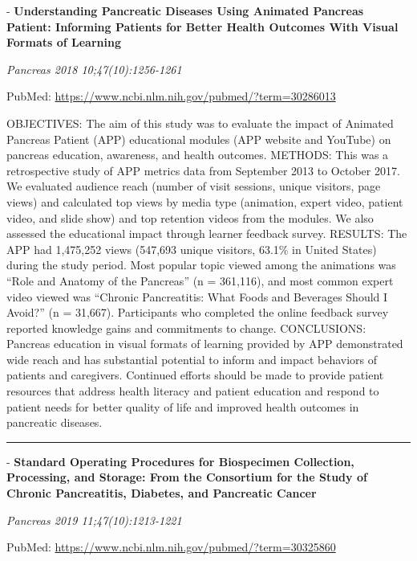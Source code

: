 \documentclass[]{article}
\begin{document}
 - \textbf{Understanding Pancreatic Diseases Using Animated Pancreas
Patient: Informing Patients for Better Health Outcomes With Visual
Formats of Learning}

\emph{Pancreas 2018 10;47(10):1256-1261}

PubMed: \url{https://www.ncbi.nlm.nih.gov/pubmed/?term=30286013}

OBJECTIVES: The aim of this study was to evaluate the impact of Animated
Pancreas Patient (APP) educational modules (APP website and YouTube) on
pancreas education, awareness, and health outcomes. METHODS: This was a
retrospective study of APP metrics data from September 2013 to October
2017. We evaluated audience reach (number of visit sessions, unique
visitors, page views) and calculated top views by media type (animation,
expert video, patient video, and slide show) and top retention videos
from the modules. We also assessed the educational impact through
learner feedback survey. RESULTS: The APP had 1,475,252 views (547,693
unique visitors, 63.1\% in United States) during the study period. Most
popular topic viewed among the animations was ``Role and Anatomy of the
Pancreas'' (n = 361,116), and most common expert video viewed was
``Chronic Pancreatitis: What Foods and Beverages Should I Avoid?'' (n =
31,667). Participants who completed the online feedback survey reported
knowledge gains and commitments to change. CONCLUSIONS: Pancreas
education in visual formats of learning provided by APP demonstrated
wide reach and has substantial potential to inform and impact behaviors
of patients and caregivers. Continued efforts should be made to provide
patient resources that address health literacy and patient education and
respond to patient needs for better quality of life and improved health
outcomes in pancreatic diseases.

{}

{}

\begin{center}\rule{0.5\linewidth}{\linethickness}\end{center}

 - \textbf{Standard Operating Procedures for Biospecimen Collection,
Processing, and Storage: From the Consortium for the Study of Chronic
Pancreatitis, Diabetes, and Pancreatic Cancer}

\emph{Pancreas 2019 11;47(10):1213-1221}

PubMed: \url{https://www.ncbi.nlm.nih.gov/pubmed/?term=30325860}
\end{document}
